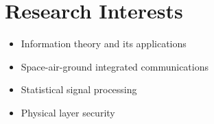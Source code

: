 \documentclass[12pt]{article} %
\begin{document}
\section{Research Interests}
\begin{itemize}
\item Information theory and its applications
\item Space-air-ground integrated communications
\item Statistical signal processing
\item Physical layer security
\end{itemize}
\end{document}
